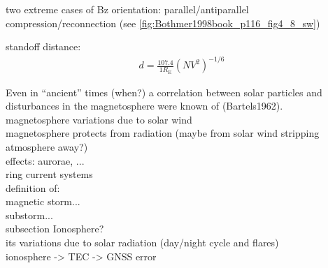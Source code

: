 two extreme cases of Bz orientation: parallel/antiparallel\\
compression/reconnection (see \autoref{fig:Bothmer1998book_p116_fig4_8_sw})\\
\begin{figure}[htb]
\end{figure}

standoff distance:	\citep[p.~112]{Bothmer2007}
\begin{align}
	d = \frac{107.4}{1 R_\text{E}} (N V^2)^{-1/6}
\end{align}

Even in ``ancient'' times (when?) a correlation between solar particles and disturbances in the magnetosphere were known of (Bartels1962).\\

magnetosphere variations due to solar wind\\
magnetosphere protects from radiation (maybe from solar wind stripping atmosphere away?)\\

effects: aurorae, ...\\

ring current systems\\

definition of:\\
magnetic storm...\\
substorm...\\

subsection Ionosphere?\\
its variations due to solar radiation (day/night cycle and flares)\\
ionosphere -> TEC -> GNSS error\\


